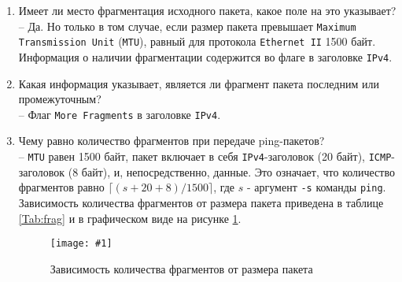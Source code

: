 \documentclass[12pt, a4paper]{article}
\newcommand{\figc}[4]{
  \begin{figure}[h]
  \begin{center}
    \texttt{[image: \#1]}
    \caption{#2}
    \label{fig:#3}
  \end{center}
  \end{figure}
}
\begin{document}
\begin{enumerate}
  \item Имеет ли место фрагментация исходного пакета, какое поле на это указывает?\\
    -- Да. Но только в том случае, если размер пакета превышает \texttt{Maximum
    Transmission Unit} (\texttt{MTU}), равный для протокола \texttt{Ethernet II}
    1500 байт. Информация о наличии фрагментации содержится во флаге в заголовке
    \texttt{IPv4}.
  \item Какая информация указывает, является ли фрагмент пакета последним или
    промежуточным?\\
    -- Флаг \texttt{More Fragments} в заголовке \texttt{IPv4}.
  \item Чему равно количество фрагментов при передаче ping-пакетов?\\
    -- \texttt{MTU} равен 1500 байт, пакет включает в себя \texttt{IPv4}-заголовок
    (20 байт), \texttt{ICMP}-заголовок (8 байт), и, непосредственно, данные.
    Это означает, что количество фрагментов равно $\lceil ( s + 20 + 8 ) / 1500 \rceil$,
    где $s$ - аргумент \texttt{-s} команды \texttt{ping}. Зависимость количества
    фрагментов от размера пакета приведена в таблице \ref{Tab:frag} и в
    графическом виде на рисунке \ref{fig:frag}.

    \figc{frag}{Зависимость количества фрагментов от размера пакета}{frag}{0.8}


\end{enumerate}
\end{document}

